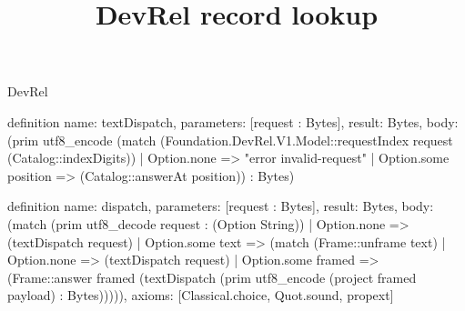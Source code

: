 \begin{lexlean}{DevRel}
\title{DevRel record lookup}
\begin{semanticmodule}
definition{
  name: textDispatch,
  parameters: [request : Bytes],
  result: Bytes,
  body: (prim utf8_encode (match (Foundation.DevRel.V1.Model::requestIndex request (Catalog::indexDigits))
    | Option.none => "error invalid-request"
    | Option.some position => (Catalog::answerAt position)) : Bytes)
}

definition{
  name: dispatch,
  parameters: [request : Bytes],
  result: Bytes,
  body: (match (prim utf8_decode request : (Option String))
    | Option.none => (textDispatch request)
    | Option.some text => (match (Frame::unframe text)
      | Option.none => (textDispatch request)
      | Option.some framed => (Frame::answer framed (textDispatch (prim utf8_encode (project framed payload) : Bytes))))),
  axioms: [Classical.choice, Quot.sound, propext]
}


\end{semanticmodule}
\end{lexlean}

